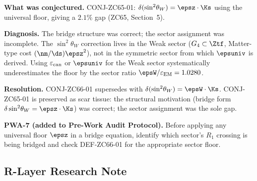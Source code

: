 \documentclass[12pt, a4paper]{article}
\renewcommand{\epsEM}{\varepsilon_{\rm EM}}
\renewcommand{\epscan}{\varepsilon_{\rm can}}
\renewcommand{\swsq}{\sin^2\!\theta_W}
\begin{document}
\begin{derivedbox}[title={PM-ZC66-01: CONJ-ZC65-01 Sector-Assignment Scar}]
\textbf{What was conjectured.}
CONJ-ZC65-01: $\delta(\swsq) = \epsz\cdot\Ks$ using the
universal floor, giving a $2.1\%$ gap (ZC65, Section~5).

\textbf{Diagnosis.}
The bridge structure was correct; the sector assignment was
incomplete.
The $\swsq$ correction lives in the Weak sector
($G_4 \subset \Ztf$, Matter-type cost $(\nm/\ds)\epsz^{2}$),
not in the symmetric sector from which $\epsuniv$ is derived.
Using $\epscan$ or $\epsuniv$ for the Weak sector systematically
underestimates the floor by the sector ratio $\epsW/\epsEM = 1.0280$.

\textbf{Resolution.}
CONJ-ZC66-01 supersedes with $\delta(\swsq) = \epsW\cdot\Ks$.
CONJ-ZC65-01 is preserved as scar tissue: the structural motivation
(bridge form $\delta\swsq = \epsz\cdot\Ks$) was correct; the
sector assignment was the sole gap.

\textbf{PWA-7 (added to Pre-Work Audit Protocol).}
Before applying any universal floor $\epsz$ in a bridge equation,
identify which sector's $R_1$ crossing is being bridged and
check DEF-ZC66-01 for the appropriate sector floor.
\end{derivedbox}

\subsection{R-Layer Research Note}
\label{sec:rlayer}
\end{document}
